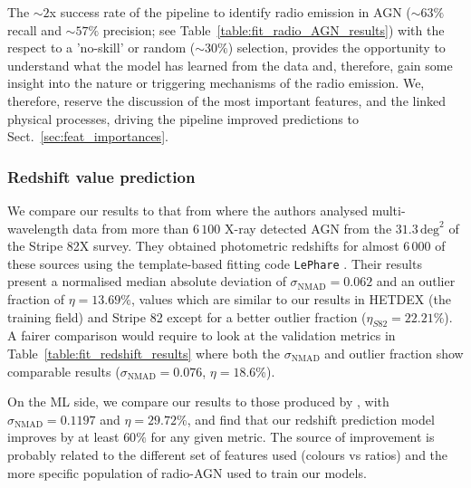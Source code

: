 \documentclass{aa}
\begin{document}
The ${\sim} 2$x success rate of the pipeline to identify radio emission in AGN (${\sim} 63\%$ recall and ${\sim} 57\%$ precision; see Table~\ref{table:fit_radio_AGN_results}) with the respect to a 'no-skill' or random (${\sim}30 \%$) selection, 
provides the opportunity to understand what the model has learned from the data and, therefore, gain some insight into the nature or triggering mechanisms of the radio emission. We, therefore, reserve the discussion of the most important features, and the linked physical processes, driving the pipeline improved predictions to Sect.~\ref{sec:feat_importances}. 


\subsubsection{Redshift value prediction}\label{sec:previous_z_values}

We compare our results to that from \citet[][Stripe 82X]{2017ApJ...850...66A} where the authors analysed multi-wavelength data from more than $6\,100$ X-ray detected AGN from the $31.3\, \mathrm{deg}^{2}$ of the Stripe 82X survey. They obtained photometric redshifts for almost $6\,000$ of these sources using the template-based fitting code \verb|LePhare| \citep{1999MNRAS.310..540A, 2006A&A...457..841I}. Their results present a normalised median absolute deviation of $\sigma_{\mathrm{NMAD}} = 0.062$ and an outlier fraction of $\eta = 13.69 \%$, values which are similar to our results in HETDEX (the training field) and Stripe 82 except for a better outlier fraction ($\eta_{S82}=22.21\%$). A fairer comparison would require to look at the validation metrics in Table~\ref{table:fit_redshift_results} where both the $\sigma_{\mathrm{NMAD}}$ and outlier fraction show comparable results ($\sigma_{\mathrm{NMAD}} = 0.076$, $\eta = 18.6$\%).

On the ML side, we compare our results to those produced by \citet{2021Galax...9...86C}, with $\sigma_{\mathrm{NMAD}} = 0.1197$ and $\eta = 29.72 \%$, and find that our redshift prediction model improves by at least $60 \%$ for any given metric.
The source of improvement is probably related to the different set of features used (colours vs ratios) and the more specific population of radio-AGN used to train our models.
\end{document}
